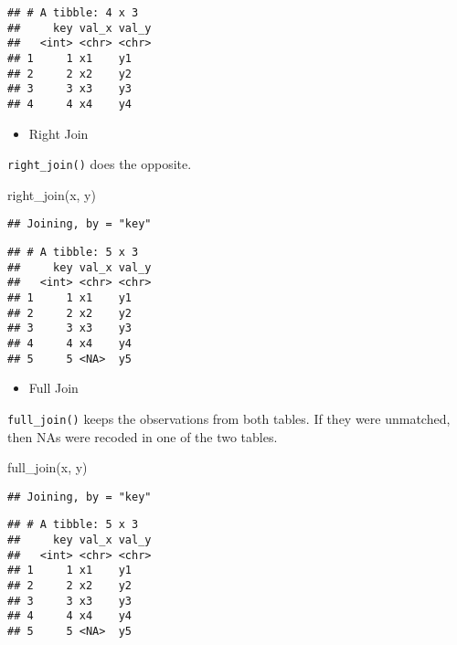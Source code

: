 \documentclass[
]{book}
\newenvironment{Shaded}{\begin{snugshade}}{\end{snugshade}}
\newcommand{\FunctionTok}[1]{\textcolor[rgb]{0.00,0.00,0.00}{#1}}
\newcommand{\NormalTok}[1]{#1}
\providecommand{\tightlist}{%
  \setlength{\itemsep}{0pt}\setlength{\parskip}{0pt}}
\begin{document}
\begin{verbatim}
## # A tibble: 4 x 3
##     key val_x val_y
##   <int> <chr> <chr>
## 1     1 x1    y1   
## 2     2 x2    y2   
## 3     3 x3    y3   
## 4     4 x4    y4
\end{verbatim}

\begin{itemize}
\tightlist
\item
  Right Join
\end{itemize}

\texttt{right\_join()} does the opposite.

\begin{Shaded}
\begin{Highlighting}[]
\FunctionTok{right\_join}\NormalTok{(x, y)}
\end{Highlighting}
\end{Shaded}

\begin{verbatim}
## Joining, by = "key"
\end{verbatim}

\begin{verbatim}
## # A tibble: 5 x 3
##     key val_x val_y
##   <int> <chr> <chr>
## 1     1 x1    y1   
## 2     2 x2    y2   
## 3     3 x3    y3   
## 4     4 x4    y4   
## 5     5 <NA>  y5
\end{verbatim}

\begin{itemize}
\tightlist
\item
  Full Join
\end{itemize}

\texttt{full\_join()} keeps the observations from both tables. If they were unmatched, then NAs were recoded in one of the two tables.

\begin{Shaded}
\begin{Highlighting}[]
\FunctionTok{full\_join}\NormalTok{(x, y)}
\end{Highlighting}
\end{Shaded}

\begin{verbatim}
## Joining, by = "key"
\end{verbatim}

\begin{verbatim}
## # A tibble: 5 x 3
##     key val_x val_y
##   <int> <chr> <chr>
## 1     1 x1    y1   
## 2     2 x2    y2   
## 3     3 x3    y3   
## 4     4 x4    y4   
## 5     5 <NA>  y5
\end{verbatim}
\end{document}
